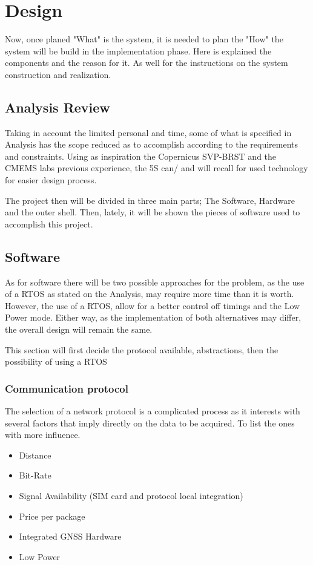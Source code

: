 \chapter{Design}
Now, once planed "What" is the system, it is needed to plan the "How" the system will be build in 
the implementation phase. Here is explained the components and the reason for it. As well
for the instructions on the system construction and realization.

\section{Analysis Review}

Taking in account the limited personal and time, some of what is specified in Analysis
has the scope reduced as to accomplish according to the requirements and constraints.
Using as inspiration the Copernicus SVP-BRST and the CMEMS labs previous experience,
the 5S can/ and will recall for used technology for easier design process.

The project then will be divided in three main parts; The Software, Hardware and the outer shell.
Then, lately, it will be shown the pieces of software used to accomplish this project. 

\section{Software}

As for software there will be two possible approaches for the problem, as the use of a RTOS
as stated on the Analysis, may require more time than it is worth. However, the use of a
RTOS, allow for a better control off timings and the Low Power mode. Either way, as the
implementation of both alternatives may differ, the overall design will remain the same. 

This section will first decide the protocol available, abstractions, then the possibility of using a RTOS

\subsection{Communication protocol}

The selection of a network protocol is a complicated process as it interests with several
factors that imply directly on the data to be acquired. To list the ones with more influence.

\begin{itemize}
    \item Distance
    \item Bit-Rate
    \item Signal Availability (SIM card and protocol local integration)
    \item Price per package
    \item Integrated GNSS Hardware
    \item Low Power
\end{itemize}

